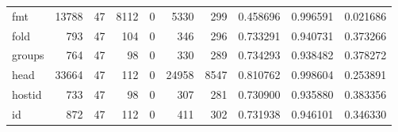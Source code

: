 \begin{longtable}{lrrrrrrrrr}
fmt       &                                              13788 &                                                 47 &                                               8112 &                                                  0 &                                               5330 &                                                299 &                                           0.458696 &                               0.996591 &                             0.021686 \\
fold      &                                                793 &                                                 47 &                                                104 &                                                  0 &                                                346 &                                                296 &                                           0.733291 &                               0.940731 &                             0.373266 \\
groups    &                                                764 &                                                 47 &                                                 98 &                                                  0 &                                                330 &                                                289 &                                           0.734293 &                               0.938482 &                             0.378272 \\
head      &                                              33664 &                                                 47 &                                                112 &                                                  0 &                                              24958 &                                               8547 &                                           0.810762 &                               0.998604 &                             0.253891 \\
hostid    &                                                733 &                                                 47 &                                                 98 &                                                  0 &                                                307 &                                                281 &                                           0.730900 &                               0.935880 &                             0.383356 \\
id        &                                                872 &                                                 47 &                                                112 &                                                  0 &                                                411 &                                                302 &                                           0.731938 &                               0.946101 &                             0.346330 \\

\end{longtable}
